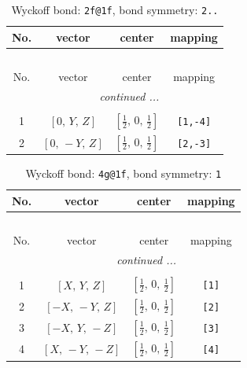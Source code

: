 \documentclass[fleqn,8pt]{jsarticle}
\begin{document}
\begin{longtable}{cccc}
\caption{Wyckoff bond: {\tt 2f@1f}, bond symmetry: {\tt 2..}}
 \\
 \hline \hline
No. & vector & center & mapping \\ \hline \endfirsthead

\multicolumn{3}{l}{\tablename\ \thetable{}} \\
 \hline \hline
No. & vector & center & mapping \\ \hline \endhead

 \hline \hline
\multicolumn{3}{r}{\footnotesize\it continued ...} \\ \endfoot

 \hline \hline
\multicolumn{3}{r}{} \\ \endlastfoot

1 & $\left[ 0,\, Y,\, Z \right]$ & $\left[ \frac{1}{2},\, 0,\, \frac{1}{2} \right]$ & {\tt [1,-4]} \\ \hline
2 & $\left[ 0,\, - Y,\, Z \right]$ & $\left[ \frac{1}{2},\, 0,\, \frac{1}{2} \right]$ & {\tt [2,-3]} \\
\end{longtable}
\renewcommand{\arraystretch}{1.2}
\begin{longtable}{cccc}
\caption{Wyckoff bond: {\tt 4g@1f}, bond symmetry: {\tt 1}}
 \\
 \hline \hline
No. & vector & center & mapping \\ \hline \endfirsthead

\multicolumn{3}{l}{\tablename\ \thetable{}} \\
 \hline \hline
No. & vector & center & mapping \\ \hline \endhead

 \hline \hline
\multicolumn{3}{r}{\footnotesize\it continued ...} \\ \endfoot

 \hline \hline
\multicolumn{3}{r}{} \\ \endlastfoot

1 & $\left[ X,\, Y,\, Z \right]$ & $\left[ \frac{1}{2},\, 0,\, \frac{1}{2} \right]$ & {\tt [1]} \\ \hline
2 & $\left[ - X,\, - Y,\, Z \right]$ & $\left[ \frac{1}{2},\, 0,\, \frac{1}{2} \right]$ & {\tt [2]} \\ \hline
3 & $\left[ - X,\, Y,\, - Z \right]$ & $\left[ \frac{1}{2},\, 0,\, \frac{1}{2} \right]$ & {\tt [3]} \\ \hline
4 & $\left[ X,\, - Y,\, - Z \right]$ & $\left[ \frac{1}{2},\, 0,\, \frac{1}{2} \right]$ & {\tt [4]} \\
\end{longtable}
\end{document}
